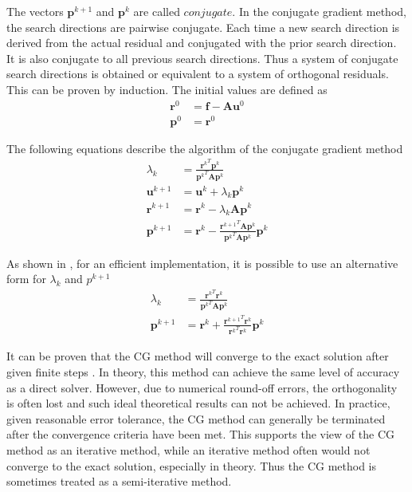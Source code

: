 The vectors $\boldsymbol{p}^{k+1}$ and $\boldsymbol{p}^k$ are called $conjugate$. In the conjugate gradient method, the search directions are pairwise conjugate. Each time a new search direction is derived from the actual residual and conjugated with the prior search direction. It is also conjugate to all previous search directions. Thus a system of conjugate search directions is obtained or equivalent to a system of orthogonal residuals. This can be proven by induction.
The initial values are defined as
\begin{align}
    \boldsymbol{r}^0 &= \boldsymbol{f} - \boldsymbol{A}\boldsymbol{u}^0 \nonumber \\ \boldsymbol{p}^0 &= \boldsymbol{r}^0
\end{align}

The following equations describe the algorithm of the conjugate gradient method
\begin{align}
    \lambda_k &= \frac{{\boldsymbol{r}^k}^T\boldsymbol{p}^k}{{\boldsymbol{p}^k}^T\boldsymbol{A}\boldsymbol{p}^k} \\
    \boldsymbol{u}^{k+1} &= \boldsymbol{u}^k + \lambda_k\boldsymbol{p}^k \\
    \boldsymbol{r}^{k+1} &= \boldsymbol{r}^k - \lambda_k\boldsymbol{A}\boldsymbol{p}^k \\
    \boldsymbol{p}^{k+1} &= \boldsymbol{r}^k - \frac{{\boldsymbol{r}^{k+1}}^T\boldsymbol{A}\boldsymbol{p}^k}{{\boldsymbol{p}^k}^T \boldsymbol{A}\boldsymbol{p}^k} \boldsymbol{p}^k %
\end{align}

As shown in \citep{https://doi.org/10.1002/zamm.19940740205}, for an efficient implementation, it is possible to use an alternative form for $\lambda_k$ and $p^{k+1}$
\begin{align}
     \lambda_k &= \frac{{\boldsymbol{r}^k}^T\boldsymbol{r}^k}{{\boldsymbol{p}^k}^T\boldsymbol{A}\boldsymbol{p}^k} \\
     \boldsymbol{p}^{k+1} &= \boldsymbol{r}^k + \frac{{\boldsymbol{r}^{k+1}}^T\boldsymbol{r}^k}{{\boldsymbol{r}^k}^T\boldsymbol{r}^k}\boldsymbol{p}^k
\end{align}

It can be proven that the CG method will converge to the exact solution after given finite steps \citep{doi:10.1137/1.9781611970937}. In theory, this method can achieve the same level of accuracy as a direct solver. However, due to numerical round-off errors, the orthogonality is often lost and such ideal theoretical results can not be achieved. In practice, given reasonable error tolerance, the CG method can generally be terminated after the convergence criteria have been met. This supports the view of the CG method as an iterative method, while an iterative method often would not converge to the exact solution, especially in theory. Thus the CG method is sometimes treated as a semi-iterative method.